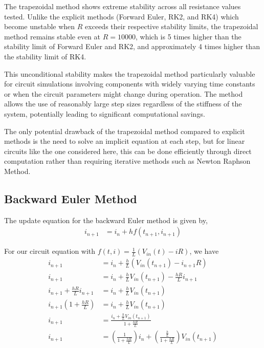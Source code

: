 \documentclass[12pt]{article}
\newcommand{\brak}[1]{\ensuremath{\left(#1\right)}}
\begin{document}
The trapezoidal method shows extreme stability across all resistance values tested. Unlike the explicit methods (Forward Euler, RK2, and RK4) which become unstable when $R$ exceeds their respective stability limits, the trapezoidal method remains stable even at $R = 10000$, which is 5 times higher than the stability limit of Forward Euler and RK2, and approximately 4 times higher than the stability limit of RK4.
\newline\newline

This unconditional stability makes the trapezoidal method particularly valuable for circuit simulations involving components with widely varying time constants or when the circuit parameters might change during operation. The method allows the use of reasonably large step sizes regardless of the stiffness of the system, potentially leading to significant computational savings.
\newline\newline

The only potential drawback of the trapezoidal method compared to explicit methods is the need to solve an implicit equation at each step, but for linear circuits like the one considered here, this can be done efficiently through direct computation rather than requiring iterative methods such as Newton Raphson Method.

\subsection{Backward Euler Method}
The update equation for the backward Euler method is given by,
\begin{align*}
i_{n+1} &= i_n + h f(t_{n+1}, i_{n+1})
\end{align*}

For our circuit equation with $f(t, i) = \frac{1}{L}(V_{in}(t) - iR)$, we have
\begin{align*}
i_{n+1} &= i_n + \frac{h}{L}(V_{in}(t_{n+1}) - i_{n+1}R) \\
i_{n+1} &= i_n + \frac{h}{L}V_{in}(t_{n+1}) - \frac{hR}{L}i_{n+1}\\
i_{n+1} + \frac{hR}{L}i_{n+1} &= i_n + \frac{h}{L}V_{in}(t_{n+1}) \\
i_{n+1}\left(1 + \frac{hR}{L}\right) &= i_n + \frac{h}{L}V_{in}(t_{n+1}) \\
i_{n+1} &= \frac{i_n + \frac{h}{L}V_{in}(t_{n+1})}{1 + \frac{hR}{L}} \\
i_{n+1} &= \brak{\frac{1}{1 + \frac{hR}{L}}}i_n + \brak{\frac{\frac{h}{L}}{1 + \frac{hR}{L}}}V_{in}(t_{n+1})
\end{align*}
\end{document}
